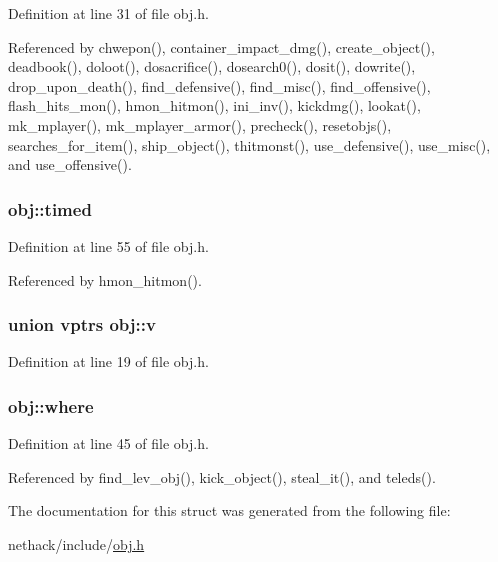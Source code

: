 Definition at line 31 of file obj.\+h.



Referenced by chwepon(), container\+\_\+impact\+\_\+dmg(), create\+\_\+object(), deadbook(), doloot(), dosacrifice(), dosearch0(), dosit(), dowrite(), drop\+\_\+upon\+\_\+death(), find\+\_\+defensive(), find\+\_\+misc(), find\+\_\+offensive(), flash\+\_\+hits\+\_\+mon(), hmon\+\_\+hitmon(), ini\+\_\+inv(), kickdmg(), lookat(), mk\+\_\+mplayer(), mk\+\_\+mplayer\+\_\+armor(), precheck(), resetobjs(), searches\+\_\+for\+\_\+item(), ship\+\_\+object(), thitmonst(), use\+\_\+defensive(), use\+\_\+misc(), and use\+\_\+offensive().

\hypertarget{structobj_a1606b78f4b7e85536033e77348551f5f}{
\subsubsection[{timed}]{ obj\+::timed}}\label{structobj_a1606b78f4b7e85536033e77348551f5f}


Definition at line 55 of file obj.\+h.



Referenced by hmon\+\_\+hitmon().

\hypertarget{structobj_a5ac1ba635501e7c9e4c37f2eec997920}{
\subsubsection[{v}]{\setlength{\rightskip}{0pt plus 5cm}union {\bf vptrs} obj\+::v}}\label{structobj_a5ac1ba635501e7c9e4c37f2eec997920}


Definition at line 19 of file obj.\+h.

\hypertarget{structobj_a57f24060a7aa1c3d2fd02c1c550cb5c6}{
\subsubsection[{where}]{ obj\+::where}}\label{structobj_a57f24060a7aa1c3d2fd02c1c550cb5c6}


Definition at line 45 of file obj.\+h.



Referenced by find\+\_\+lev\+\_\+obj(), kick\+\_\+object(), steal\+\_\+it(), and teleds().



The documentation for this struct was generated from the following file\+:\begin{DoxyCompactItemize}
\item 
nethack/include/\hyperlink{obj_8h}{obj.\+h}\end{DoxyCompactItemize}
